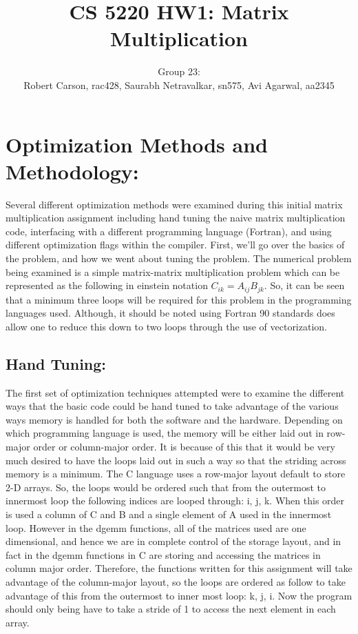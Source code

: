 \documentclass{article}
\begin{document}
\title{CS 5220 HW1: Matrix Multiplication}
\author{Group 23: \\Robert Carson, rac428, Saurabh Netravalkar, sn575, Avi Agarwal, aa2345}
\renewcommand{\today}{17 Sept. 2015}
\maketitle

\section*{Optimization Methods and Methodology:} 

Several different optimization methods were examined during this initial matrix multiplication assignment including hand tuning the naive matrix multiplication code, interfacing with a different programming language (Fortran), and using different optimization flags within the compiler.  First, we'll go over the basics of the problem, and how we went about tuning the problem. The numerical problem being examined is a simple matrix-matrix multiplication problem which can be represented as the following in einstein notation  $C_{ik} = A_{ij}B_{jk}$. 
So, it can be seen that a minimum three loops will be required for this problem in the programming languages used. Although, it should be noted using Fortran 90 standards does allow one to reduce this down to two loops through the use of vectorization. 

\subsection*{Hand Tuning:}

The first set of optimization techniques attempted were to examine the different ways that the basic code could be hand tuned to take advantage of the various ways memory is handled for both the software and the hardware.  Depending on which programming language is used, the memory will be either laid out in row-major order or column-major order. It is because of this that it would be very much desired to have the loops laid out in such a way so that the striding across memory is a minimum. The C language uses a row-major layout default to store 2-D arrays.  So, the loops would be ordered such that from the outermost to innermost loop the following indices are looped through: i, j, k. When this order is used a column of C and B and a single element of A used in the innermost loop. However in the dgemm functions, all of the matrices used are one dimensional, and hence we are in complete control of the storage layout, and in fact in the dgemm functions in C are storing and accessing the matrices in column major order.  Therefore, the functions written for this assignment will take advantage of the column-major layout, so the loops are ordered as follow to take advantage of this from the outermost to inner most loop: k, j, i. Now the program should only being have to take a stride of 1 to access the next element in each array.
\end{document}
